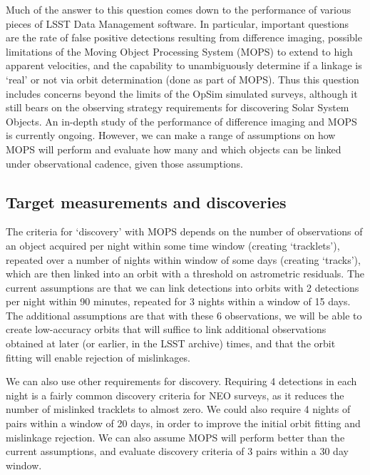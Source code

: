 Much of the answer to this question comes down to the performance of
various pieces of LSST Data Management software. In particular,
important questions are the
rate of false positive detections resulting from difference imaging, possible
limitations of the Moving Object Processing System (MOPS) to extend to high
apparent velocities, and the capability to unambiguously determine if
a linkage is `real' or not via orbit determination (done as part of
MOPS). Thus this question includes concerns beyond the limits of the OpSim simulated
surveys, although it still bears on the observing strategy requirements for
discovering Solar System Objects. An in-depth study of the performance
of difference imaging and MOPS is currently ongoing. However, we can
make a range of assumptions on how MOPS will perform and evaluate how
many and which objects can be linked under observational cadence, given those assumptions.



\subsection{Target measurements and discoveries}
\label{sec:\secname:targets}

The criteria for `discovery' with MOPS depends on the number
of observations of an object acquired per night within some time
window (creating `tracklets'), repeated over a number of nights within window of some
days (creating `tracks'), which are then linked into an orbit with a threshold on
astrometric residuals. The current assumptions are that we can link
detections into orbits with 2 detections per night within 90 minutes,
repeated for 3 nights within a window of 15 days. The additional assumptions are
that with these 6 observations, we will be able to create low-accuracy orbits that will suffice to link
additional observations obtained at later (or earlier, in the LSST
archive) times, and that the orbit fitting will enable rejection
of mislinkages.

We can also use other requirements for discovery. Requiring 4
detections in each night is a fairly common discovery criteria for
NEO surveys, as it reduces the number of mislinked tracklets to almost
zero. We could also require 4 nights of pairs within a window of 20 days, in order to improve the
initial orbit fitting and mislinkage rejection. We can also assume
MOPS will perform better than the current assumptions, and evaluate
discovery criteria of 3 pairs within a 30 day window.

